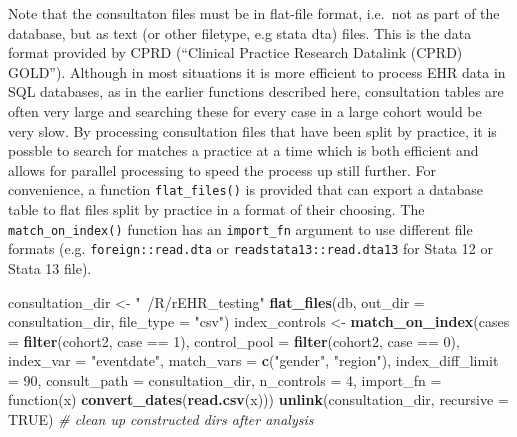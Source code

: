 \documentclass[]{article}
\newenvironment{Shaded}{\begin{snugshade}}{\end{snugshade}}
\newcommand{\KeywordTok}[1]{\textcolor[rgb]{0.13,0.29,0.53}{\textbf{{#1}}}}
\newcommand{\DataTypeTok}[1]{\textcolor[rgb]{0.13,0.29,0.53}{{#1}}}
\newcommand{\DecValTok}[1]{\textcolor[rgb]{0.00,0.00,0.81}{{#1}}}
\newcommand{\StringTok}[1]{\textcolor[rgb]{0.31,0.60,0.02}{{#1}}}
\newcommand{\CommentTok}[1]{\textcolor[rgb]{0.56,0.35,0.01}{\textit{{#1}}}}
\newcommand{\OtherTok}[1]{\textcolor[rgb]{0.56,0.35,0.01}{{#1}}}
\newcommand{\NormalTok}[1]{{#1}}
\begin{document}
Note that the consultaton files must be in flat-file format, i.e.~not as
part of the database, but as text (or other filetype, e.g stata dta)
files. This is the data format provided by CPRD (``Clinical Practice
Research Datalink (CPRD) GOLD''). Although in most situations it is more
efficient to process EHR data in SQL databases, as in the earlier
functions described here, consultation tables are often very large and
searching these for every case in a large cohort would be very slow. By
processing consultation files that have been split by practice, it is
possble to search for matches a practice at a time which is both
efficient and allows for parallel processing to speed the process up
still further. For convenience, a function \texttt{flat\_files()} is
provided that can export a database table to flat files split by
practice in a format of their choosing. The \texttt{match\_on\_index()}
function has an \texttt{import\_fn} argument to use different file
formats (e.g. \texttt{foreign::read.dta} or
\texttt{readstata13::read.dta13} for Stata 12 or Stata 13 file).

\begin{Shaded}
\begin{Highlighting}[]
\NormalTok{consultation_dir <-}\StringTok{ "~/R/rEHR_testing"}
\KeywordTok{flat_files}\NormalTok{(db, }\DataTypeTok{out_dir =} \NormalTok{consultation_dir, }\DataTypeTok{file_type =} \StringTok{"csv"}\NormalTok{)}
\NormalTok{index_controls <-}\StringTok{ }\KeywordTok{match_on_index}\NormalTok{(}\DataTypeTok{cases =} \KeywordTok{filter}\NormalTok{(cohort2, case ==}\StringTok{ }\DecValTok{1}\NormalTok{), }
                                 \DataTypeTok{control_pool =} \KeywordTok{filter}\NormalTok{(cohort2, case ==}\StringTok{ }\DecValTok{0}\NormalTok{),}
                                 \DataTypeTok{index_var =} \StringTok{"eventdate"}\NormalTok{, }
                                 \DataTypeTok{match_vars =} \KeywordTok{c}\NormalTok{(}\StringTok{"gender"}\NormalTok{, }\StringTok{"region"}\NormalTok{),}
                                 \DataTypeTok{index_diff_limit =} \DecValTok{90}\NormalTok{, }
                                 \DataTypeTok{consult_path =} \NormalTok{consultation_dir,}
                                 \DataTypeTok{n_controls =} \DecValTok{4}\NormalTok{,}
                                 \DataTypeTok{import_fn =} \NormalTok{function(x) }\KeywordTok{convert_dates}\NormalTok{(}\KeywordTok{read.csv}\NormalTok{(x)))}
\KeywordTok{unlink}\NormalTok{(consultation_dir, }\DataTypeTok{recursive =} \OtherTok{TRUE}\NormalTok{) }\CommentTok{# clean up constructed dirs after analysis}
\end{Highlighting}
\end{Shaded}
\end{document}
